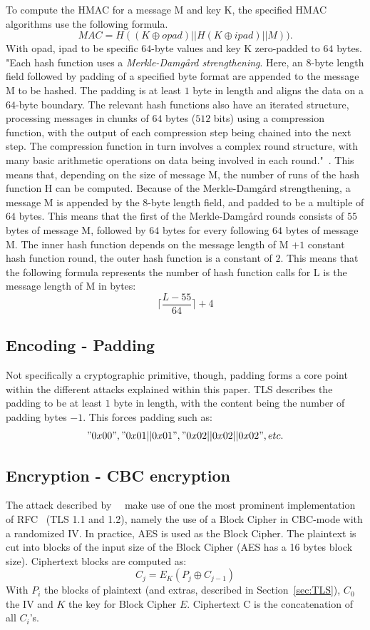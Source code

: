 \documentclass[10pt,conference,a4paper]{IEEEtran}
\begin{document}
To compute the HMAC for a message M and key K, the specified HMAC algorithms use the following formula. 
\[ MAC = H((K \oplus opad)||H(K \oplus ipad)||M)). \]
With opad, ipad to be specific $64$-byte values and key K zero-padded to $64$ bytes. "Each hash function uses a \textit{Merkle-Damg\aa rd strengthening}. Here, an 8-byte length field followed by padding of a specified byte format are appended to the message M to be hashed. The padding is at least $1$ byte in length and aligns the data on a $64$-byte boundary. The relevant hash functions also have an iterated structure, processing messages in chunks of $64$ bytes ($512$ bits) using a compression function, with the output of each compression step being chained into the next step. The compression function in turn involves a complex round structure, with many basic arithmetic operations on data being involved in each round."~\cite{alfardan2013lucky}. This means that, depending on the size of message M, the number of runs of the hash function H can be computed. Because of the Merkle-Damg\aa rd strengthening, a message M is appended by the $8$-byte length field, and padded to be a multiple of $64$ bytes. This means that the first of the Merkle-Damg\aa rd rounds consists of $55$ bytes of message M, followed by $64$ bytes for every following $64$ bytes of message M. The inner hash function depends on the message length of M $+ 1$ constant hash function round, the outer hash function is a constant of $2$. This means that the following formula represents the number of hash function calls for L is the message length of M in bytes:
\[ \lceil \frac{L - 55}{64} \rceil + 4 \]

\subsection{Encoding - Padding}
\label{sec:crypto:padding}
Not specifically a cryptographic primitive, though, padding forms a core point within the different attacks explained within this paper. TLS describes the padding to be at least $1$ byte in length, with the content being the number of padding bytes $- 1$. This forces padding such as:
\["0x00", "0x01||0x01", "0x02||0x02||0x02", etc. \]

\subsection{Encryption - CBC encryption}
\label{sec:crypto:encryption}
The attack described by~\citeauthor{alfardan2013lucky}~\cite{alfardan2013lucky} make use of one the most prominent implementation of RFC~\cite{ietf2008transport} (TLS 1.1 and 1.2), namely the use of a Block Cipher in CBC-mode with a randomized IV. In practice, AES is used as the Block Cipher. The plaintext is cut into blocks of the input size of the Block Cipher (AES has a 16 bytes block size). Ciphertext blocks are computed as:
\[ C_j = E_K(P_j \oplus C_{j-1}) \]
With $P_i$ the blocks of plaintext (and extras, described in Section~\ref{sec:TLS}), $C_0$ the IV and $K$ the key for Block Cipher $E$. Ciphertext C is the concatenation of all $C_i$'s.
\end{document}
